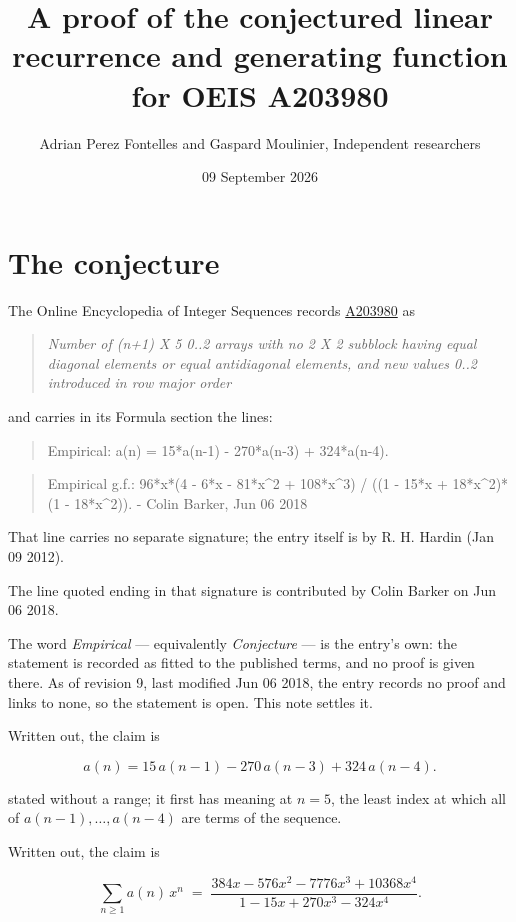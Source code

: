 \documentclass[11pt]{article}
\title{A proof of the conjectured linear recurrence and generating function for OEIS A203980}
\author{Adrian Perez Fontelles and Gaspard Moulinier, Independent researchers}
\date{09 September 2026}
\theoremstyle{definition}
\begin{document}
\maketitle
\section{The conjecture}

The Online Encyclopedia of Integer Sequences records \href{https://oeis.org/A203980}{A203980} as

\begin{quote}\itshape Number of (n+1) X 5 0..2 arrays with no 2 X 2 subblock having equal diagonal elements or equal antidiagonal elements, and new values 0..2 introduced in row major order\end{quote}

and carries in its Formula section the lines:

\begin{quote}\ttfamily Empirical: a(n) = 15*a(n-1) - 270*a(n-3) + 324*a(n-4).\end{quote}

\begin{quote}\ttfamily Empirical g.f.: 96*x*(4 - 6*x - 81*x\textasciicircum{}2 + 108*x\textasciicircum{}3) / ((1 - 15*x + 18*x\textasciicircum{}2)*(1 - 18*x\textasciicircum{}2)). - Colin Barker, Jun 06 2018\end{quote}

That line carries no separate signature; the entry itself is by R. H. Hardin (Jan 09 2012).

The line quoted ending in that signature is contributed by Colin Barker on Jun 06 2018.

The word {\itshape Empirical} --- equivalently {\itshape Conjecture} --- is the entry's own: the statement is recorded as fitted to the published terms, and no proof is given there. As of revision 9, last modified Jun 06 2018, the entry records no proof and links to none, so the statement is open. This note settles it.

Written out, the claim is

\[a(n) = 15\,a(n-1) - 270\,a(n-3) + 324\,a(n-4).\]

stated without a range; it first has meaning at $n = 5$, the least index at which all of $a(n-1),\dots,a(n-4)$ are terms of the sequence.

Written out, the claim is

\[\sum_{n \ge 1} a(n)\,x^n \;=\; \frac{384x - 576x^{2} - 7776x^{3} + 10368x^{4}}{1 - 15x + 270x^{3} - 324x^{4}}.\]
\end{document}
